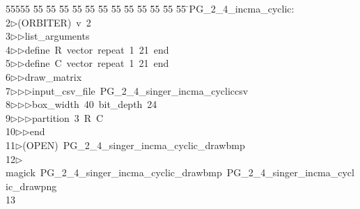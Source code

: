 %
%
\begin{tabbing}
55555 \= 55 \= 55 \= 55 \= 55 \= 55 \= 55 \= 55 \= 55 \= 55 \= 55 \= 55 \= 55 \= \>PG\_2\_4\_incma\_cyclic:\\[0pt]
2\>$\triangleright$\>(ORBITER)\ v\ 2\ \\[0pt]
3\>$\triangleright$\>$\triangleright$\>list\_arguments\ \\[0pt]
4\>$\triangleright$\>$\triangleright$\>define\ R\ vector\ repeat\ 1\ 21\ end\ \\[0pt]
5\>$\triangleright$\>$\triangleright$\>define\ C\ vector\ repeat\ 1\ 21\ end\ \\[0pt]
6\>$\triangleright$\>$\triangleright$\>draw\_matrix\ \\[0pt]
7\>$\triangleright$\>$\triangleright$\>$\triangleright$\>input\_csv\_file\ PG\_2\_4\_singer\_incma\_cycliccsv\ \\[0pt]
8\>$\triangleright$\>$\triangleright$\>$\triangleright$\>box\_width\ 40\ bit\_depth\ 24\ \\[0pt]
9\>$\triangleright$\>$\triangleright$\>$\triangleright$\>partition\ 3\ R\ C\ \\[0pt]
10\>$\triangleright$\>$\triangleright$\>end\\[0pt]
11\>$\triangleright$\>(OPEN)\ PG\_2\_4\_singer\_incma\_cyclic\_drawbmp\\[0pt]
12\>$\triangleright$\>magick\ PG\_2\_4\_singer\_incma\_cyclic\_drawbmp\ PG\_2\_4\_singer\_incma\_cyclic\_drawpng\\[0pt]
13\>\end{tabbing}
